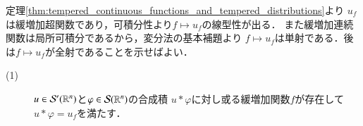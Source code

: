 	\begin{prf}
		定理\ref{thm:tempered_continuous_functions_and_tempered_distributions}より
		$u_f$は緩増加超関数であり，可積分性より$f \longmapsto u_f$の線型性が出る．
		また緩増加連続関数は局所可積分であるから，変分法の基本補題より
		$f \longmapsto u_f$は単射である．後は$f \longmapsto u_f$が全射であることを示せばよい．
	\end{prf}
	
	\begin{screen}
		\begin{thm}[緩増加超関数の合成積の性質]\mbox{}
			\begin{description}
				\item[(1)] $u \in \mathcal{S}'(\mathbb{R}^n)$と$\varphi \in \mathcal{S}(\mathbb{R}^n)$の合成積
					$u \ast \varphi$に対し或る緩増加関数$f$が存在して
					$u \ast \varphi = u_f$を満たす．
			\end{description}
		\end{thm}
	\end{screen}
	
